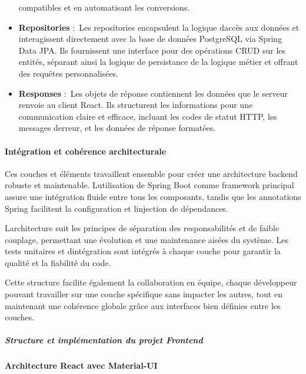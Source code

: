 \documentclass[12pt,a4paper,twoside,openright]{report}
\begin{document}
\begin{itemize}
  compatibles et en automatisant les conversions.
\item
  \textbf{Repositories} :~Les repositories encapsulent la logique
  d\textquotesingle accès aux données et interagissent directement avec
  la base de données PostgreSQL via Spring Data JPA. Ils fournissent une
  interface pour des opérations CRUD sur les entités, séparant ainsi la
  logique de persistance de la logique métier et offrant des requêtes
  personnalisées.
\item
  \textbf{Responses} :~Les objets de réponse contiennent les données que
  le serveur renvoie au client React. Ils structurent les informations
  pour une communication claire et efficace, incluant les codes de
  statut HTTP, les messages d\textquotesingle erreur, et les données de
  réponse formatées.
\end{itemize}

\hypertarget{intuxe9gration-et-cohuxe9rence-architecturale}{%
\paragraph{Intégration et cohérence
architecturale}\label{intuxe9gration-et-cohuxe9rence-architecturale}}

Ces couches et éléments travaillent ensemble pour créer une architecture
backend robuste et maintenable. L\textquotesingle utilisation de Spring
Boot comme framework principal assure une intégration fluide entre tous
les composants, tandis que les annotations Spring facilitent la
configuration et l\textquotesingle injection de dépendances.

L\textquotesingle architecture suit les principes de séparation des
responsabilités et de faible couplage, permettant une évolution et une
maintenance aisées du système. Les tests unitaires et
d\textquotesingle intégration sont intégrés à chaque couche pour
garantir la qualité et la fiabilité du code.

Cette structure facilite également la collaboration en équipe, chaque
développeur pouvant travailler sur une couche spécifique sans impacter
les autres, tout en maintenant une cohérence globale grâce aux
interfaces bien définies entre les couches.

\hypertarget{structure-et-impluxe9mentation-du-projet-frontend}{%
\subparagraph{Structure et implémentation du projet
Frontend}\label{structure-et-impluxe9mentation-du-projet-frontend}}

\hypertarget{architecture-react-avec-material-ui}{%
\paragraph{Architecture React avec
Material-UI}\label{architecture-react-avec-material-ui}}
\end{document}
